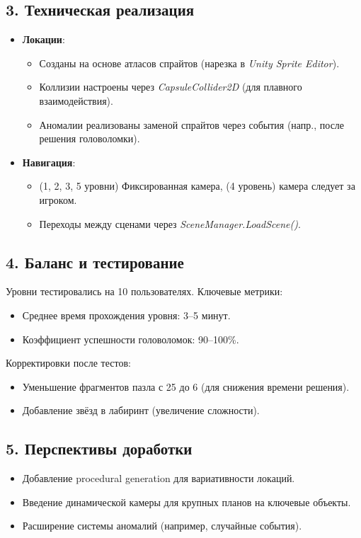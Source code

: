 \documentclass{article}
\begin{document}
\subsection*{3. Техническая реализация}
\begin{itemize}
    \item \textbf{Локации}: 
    \begin{itemize}
        \item Созданы на основе атласов спрайтов (нарезка в \textit{Unity Sprite Editor}).
        \item Коллизии настроены через \textit{CapsuleCollider2D} (для плавного взаимодействия).
        \item Аномалии реализованы заменой спрайтов через события (напр., после решения головоломки).
    \end{itemize}
    \item \textbf{Навигация}: 
    \begin{itemize}
        \item (1, 2, 3, 5 уровни) Фиксированная камера, (4 уровень) камера следует за игроком.
        \item Переходы между сценами через \textit{SceneManager.LoadScene()}.
    \end{itemize}
\end{itemize}

\subsection*{4. Баланс и тестирование}
Уровни тестировались на 10 пользователях. Ключевые метрики:
\begin{itemize}
    \item Среднее время прохождения уровня: 3--5 минут.
    \item Коэффициент успешности головоломок: 90--100\%.
\end{itemize}
Корректировки после тестов:
\begin{itemize}
    \item Уменьшение фрагментов пазла с 25 до 6 (для снижения времени решения).
    \item Добавление звёзд в лабиринт (увеличение сложности).
\end{itemize}

\subsection*{5. Перспективы доработки}
\begin{itemize}
    \item Добавление procedural generation для вариативности локаций.
    \item Введение динамической камеры для крупных планов на ключевые объекты.
    \item Расширение системы аномалий (например, случайные события).
\end{itemize}
\end{document}
